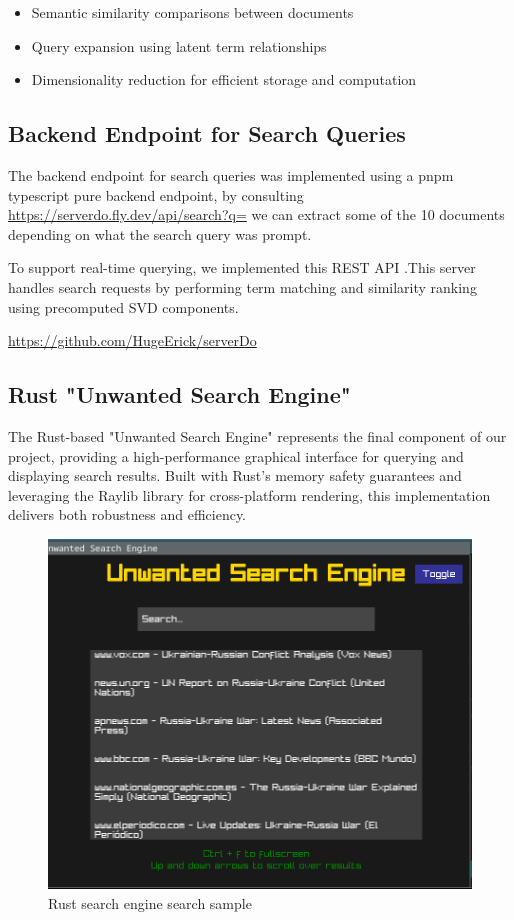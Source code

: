 \documentclass[twoside]{article}
\begin{document}
\begin{itemize}
    \item Semantic similarity comparisons between documents
    \item Query expansion using latent term relationships
    \item Dimensionality reduction for efficient storage and computation
\end{itemize}

\subsection{Backend Endpoint for Search Queries}
The backend endpoint for search queries was implemented using a pnpm typescript pure backend endpoint, by consulting \url{https://serverdo.fly.dev/api/search?q=} we can extract some of the 10 documents depending on what the search query was prompt.

To support real-time querying, we implemented this REST API .This server handles search requests by performing term matching and similarity ranking using precomputed SVD components.

\url{https://github.com/HugeErick/serverDo}


\subsection{Rust "Unwanted Search Engine"}
The Rust-based "Unwanted Search Engine" represents the final component of our project, providing a high-performance graphical interface for querying and displaying search results. Built with Rust's memory safety guarantees and leveraging the Raylib library for cross-platform rendering, this implementation delivers both robustness and efficiency.

\begin{figure}[H]
  \centering
  \includegraphics[width=1\textwidth]{imgs/search.png}
  \caption{Rust search engine search sample}
  \label{fig:7}
\end{figure}
\end{document}
